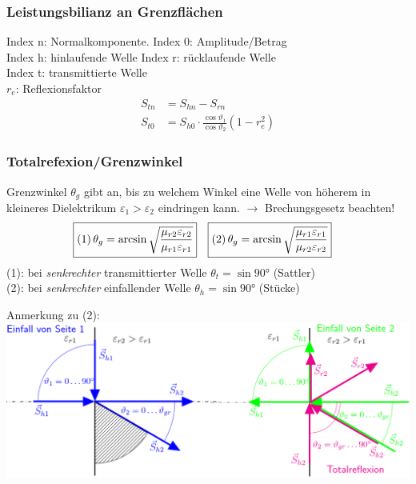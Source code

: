 \subsubsection{Leistungsbilianz an Grenzflächen}
Index n: Normalkomponente. \quad Index 0: Amplitude/Betrag\\
Index h: hinlaufende Welle \quad Index r: rücklaufende Welle\\
Index t: transmittierte Welle\\
$r_e$: Reflexionsfaktor
\begin{align*}
	S_{tn} & = S_{hn} - S_{rn}                                                  \\
	S_{t0} & = S_{h0}\cdot \frac{\cos\vartheta_{1}}{\cos\vartheta_{2}}(1-r_e^2)
\end{align*}

\subsubsection{Totalrefexion/Grenzwinkel}
Grenzwinkel $ \theta_g $ gibt an, bis zu welchem Winkel eine Welle von höherem in kleineres Dielektrikum $ \varepsilon_1 > \varepsilon_2 $ eindringen kann. $ \rightarrow $ Brechungsgesetz beachten!
\begin{align*}
	\Aboxed{(1) \, \theta_g & = \arcsin \sqrt{\frac{\mu_{r2}\varepsilon_{r2}}{\mu_{r1}\varepsilon_{r1}}} }    &
	\Aboxed{(2) \, \theta_g & = \arcsin \sqrt{ \dfrac{\mu_{r1} \varepsilon_{r1}}{\mu_{r2} \varepsilon_{r2}}}} &
\end{align*}
(1): bei \textit{senkrechter} transmittierter Welle $ \theta_t = \sin \ang{90}$ (Sattler)\\
(2): bei \textit{senkrechter} einfallender Welle $ \theta_h = \sin \ang{90}$ (Stücke)

Anmerkung zu (2):\\
\includegraphics[width=\columnwidth]{Figures/Grenzwinkel_Bild.png}

